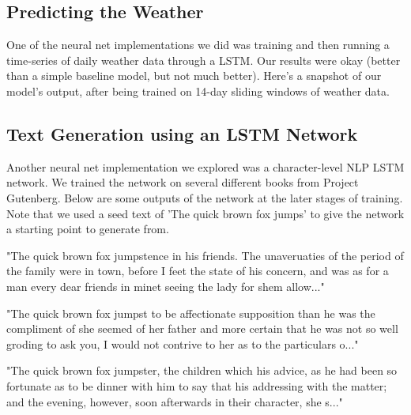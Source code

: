 \documentclass[]{article}
\begin{document}
\subsection{Predicting the Weather}

One of the neural net implementations we did was training and then running a time-series of daily weather data through a LSTM. Our results were okay (better than a simple baseline model, but not much better). Here's a snapshot of our model's output, after being trained on 14-day sliding windows of weather data.

\subsection{Text Generation using an LSTM Network}
Another neural net implementation we explored was a character-level NLP LSTM network. We trained the network on several different books from Project Gutenberg. Below are some outputs of the network at the later stages of training. Note that we used a seed text of 'The quick brown fox jumps' to give the network a starting point to generate from.

"The quick brown fox jumpstence in his friends. The unaveruaties of the period of the family were in town, before I feet the state of his concern, and was as for a man every dear friends in minet seeing the lady for shem allow..."

"The quick brown fox jumpst to be affectionate supposition than he was the compliment of she seemed of her father and more certain that he was not so well groding to ask you, I would not contrive to her as to the particulars o..."

"The quick brown fox jumpster, the children which his advice, as he had been so fortunate as to be dinner with him to say that his addressing with the matter; and the evening, however, soon afterwards in their character, she s..."
\end{document}
